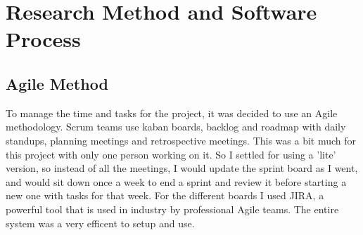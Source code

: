\section{Research Method and Software Process}
\begin{comment}
You need to describe briefly the life cycle model or research method that you used. You do not need to write about all of the different process models that you are aware of. Focus on the process model or research method that you have used. It is possible that you needed to adapt an existing method to suit your project; clearly identify what you used and how you adapted it for your needs.

For the research-oriented projects, there needs to be a suitable process for the construction of the software elements that support your work.
\end{comment}


\subsection{Agile Method}
\begin{comment}
what is it?
why am i using it?

Scrumban lite

jira board
roadmap
backlog
weekly sprints

\end{comment}

To manage the time and tasks for the project, it was decided to use an Agile methodology. Scrum teams use kaban boards, backlog and roadmap with daily standups, planning meetings and retrospective meetings. This was a bit much for this project with only one person working on it. So I settled for using a 'lite' version, so instead of all the meetings, I would update the sprint board as I went, and would sit down once a week to end a sprint and review it before starting a new one with tasks for that week. For the different boards I used JIRA, a powerful tool that is used in industry by professional Agile teams. The entire system was a very efficent to setup and use.





